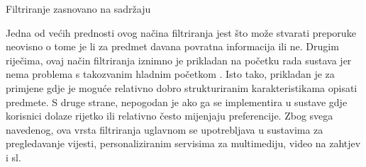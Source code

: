 \documentclass[times, utf8, diplomski, numeric]{fer}
\begin{document}
\begin{algorithm}[H]
	\caption{Filtriranje zasnovano na sadržaju}
	\label{algo:content}
	\begin{algorithmic}[1]
		
				\ENDIF
			\ENDFOR
			\ENDFOR
		\ENDFOR
		
				\ENDIF
			\ENDFOR
		\ENDFOR
		

			\ENDFOR
		\ENDFOR
		
	\end{algorithmic}
\end{algorithm}

Jedna od većih prednosti ovog načina filtriranja jest što može stvarati
preporuke neovisno o tome je li za predmet davana povratna informacija ili ne.
Drugim riječima, ovaj način filtriranja iznimno je prikladan na početku rada
sustava jer nema problema s takozvanim hladnim početkom .
Isto tako, prikladan je za primjene gdje je moguće relativno dobro strukturiranim
karakteristikama opisati predmete. S druge strane, nepogodan je ako ga
se implementira u sustave gdje korisnici dolaze rijetko ili relativno često
mijenjaju preferencije. Zbog svega navedenog, ova vrsta filtriranja uglavnom se
upotrebljava u sustavima za pregledavanje vijesti, personaliziranim servisima za
multimediju, video na zahtjev i sl.
\end{document}
